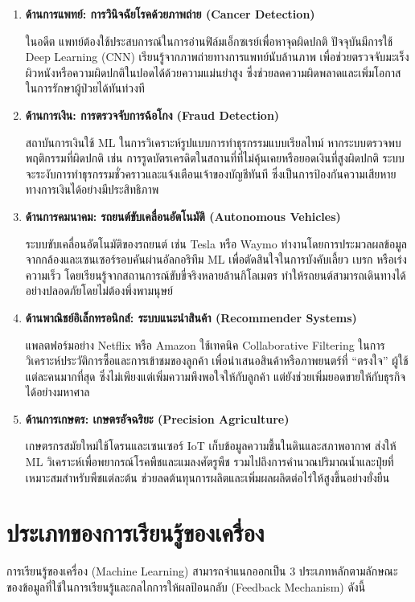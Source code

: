 \begin{enumerate}
	\item \textbf{ด้านการแพทย์: การวินิจฉัยโรคด้วยภาพถ่าย (Cancer Detection)}

	ในอดีต แพทย์ต้องใช้ประสบการณ์ในการอ่านฟิล์มเอ็กซเรย์เพื่อหาจุดผิดปกติ ปัจจุบันมีการใช้ Deep Learning (CNN) เรียนรู้จากภาพถ่ายทางการแพทย์นับล้านภาพ เพื่อช่วยตรวจจับมะเร็งผิวหนังหรือความผิดปกติในปอดได้ด้วยความแม่นยำสูง ซึ่งช่วยลดความผิดพลาดและเพิ่มโอกาสในการรักษาผู้ป่วยได้ทันท่วงที

	\item \textbf{ด้านการเงิน: การตรวจจับการฉ้อโกง (Fraud Detection)}

	สถาบันการเงินใช้ ML ในการวิเคราะห์รูปแบบการทำธุรกรรมแบบเรียลไทม์ หากระบบตรวจพบพฤติกรรมที่ผิดปกติ เช่น การรูดบัตรเครดิตในสถานที่ที่ไม่คุ้นเคยหรือยอดเงินที่สูงผิดปกติ ระบบจะระงับการทำธุรกรรมชั่วคราวและแจ้งเตือนเจ้าของบัญชีทันที ซึ่งเป็นการป้องกันความเสียหายทางการเงินได้อย่างมีประสิทธิภาพ

	\item \textbf{ด้านการคมนาคม: รถยนต์ขับเคลื่อนอัตโนมัติ (Autonomous Vehicles)}

	ระบบขับเคลื่อนอัตโนมัติของรถยนต์ เช่น Tesla หรือ Waymo ทำงานโดยการประมวลผลข้อมูลจากกล้องและเซนเซอร์รอบคันผ่านอัลกอริทึม ML เพื่อตัดสินใจในการบังคับเลี้ยว เบรก หรือเร่งความเร็ว โดยเรียนรู้จากสถานการณ์ขับขี่จริงหลายล้านกิโลเมตร ทำให้รถยนต์สามารถเดินทางได้อย่างปลอดภัยโดยไม่ต้องพึ่งพามนุษย์

	\item \textbf{ด้านพาณิชย์อิเล็กทรอนิกส์: ระบบแนะนำสินค้า (Recommender Systems)}

	แพลตฟอร์มอย่าง Netflix หรือ Amazon ใช้เทคนิค Collaborative Filtering ในการวิเคราะห์ประวัติการซื้อและการเข้าชมของลูกค้า เพื่อนำเสนอสินค้าหรือภาพยนตร์ที่ ``ตรงใจ'' ผู้ใช้แต่ละคนมากที่สุด ซึ่งไม่เพียงแต่เพิ่มความพึงพอใจให้กับลูกค้า แต่ยังช่วยเพิ่มยอดขายให้กับธุรกิจได้อย่างมหาศาล

	\item \textbf{ด้านการเกษตร: เกษตรอัจฉริยะ (Precision Agriculture)}

	เกษตรกรสมัยใหม่ใช้โดรนและเซนเซอร์ IoT เก็บข้อมูลความชื้นในดินและสภาพอากาศ ส่งให้ ML วิเคราะห์เพื่อพยากรณ์โรคพืชและแมลงศัตรูพืช รวมไปถึงการคำนวณปริมาณน้ำและปุ๋ยที่เหมาะสมสำหรับพืชแต่ละต้น ช่วยลดต้นทุนการผลิตและเพิ่มผลผลิตต่อไร่ให้สูงขึ้นอย่างยั่งยืน
\end{enumerate}

\section{ประเภทของการเรียนรู้ของเครื่อง}
การเรียนรู้ของเครื่อง (Machine Learning) สามารถจำแนกออกเป็น 3 ประเภทหลักตามลักษณะของข้อมูลที่ใช้ในการเรียนรู้และกลไกการให้ผลป้อนกลับ (Feedback Mechanism) ดังนี้

